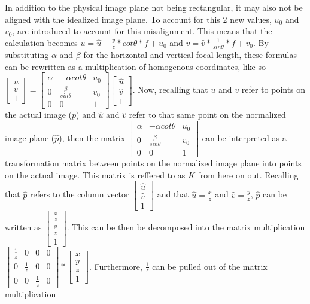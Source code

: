 In addition to the physical image plane not being rectangular, it may also not be aligned with the idealized image plane.  To
account for this 2 new values, $u_0$ and $v_0$, are introduced to account for this misalignment.  This means that the
calculation becomes $u=\hat{u}-\frac{y}{z} * cot \theta * f + u_0$ and $v=\hat{v} * \frac{1}{sin \theta} * f + 
v_0$. By substituting $\alpha$ and $\beta$ for the horizontal and vertical focal length, these formulas can be rewritten as a 
multiplication of homogenous coordinates, like so $\begin{bmatrix} u \\ v \\ 1 \end{bmatrix} = \begin{bmatrix} \alpha & -\alpha 
cot\theta & u_{0} \\ 0 & \frac{\beta}{sin\theta} & v_{0} \\ 0 & 0 & 1 \end{bmatrix} \begin{bmatrix}\hat{u} \\ \hat{v}\\ 
1\end{bmatrix}$.  
Now, recalling that $u$ and $v$ refer to points on the actual image ($p$) and $\hat{u}$ and $\hat{v}$ refer to that same point 
on the normalized image plane ($\hat{p}$), then the matrix $\begin{bmatrix} \alpha & -\alpha cot\theta & u_0 \\ 0 & \frac{\beta}
{sin\theta} & v_0 \\ 0 & 0 & 1 \end{bmatrix}$ can be interpreted as a transformation matrix between points on the normalized image 
plane into points on the actual image.  This matrix is reffered to as $K$ from here on out.  Recalling that $\hat{p}$ refers to 
the column vector $\begin{bmatrix} \hat{u} \\ \hat{v} \\ 1 \end{bmatrix}$ and that $\hat{u} = \frac{x}{z}$ and $\hat{v} = \frac{y}
{z}$, $\hat{p}$ can be written as $\begin{bmatrix} \frac{x}{z} \\ \frac{y}{z} \\ 1 \end{bmatrix}$.  This can be then be decomposed into the matrix multiplication $\begin{bmatrix} \frac{1}{z} & 0 & 0 & 0 \\ 0 & \frac{1}{z} & 0 & 0 \\ 0 & 0 & \frac{1}{z} & 0 
\end{bmatrix} * \begin{bmatrix} x \\ y \\ z \\ 1 \end{bmatrix}$.  Furthermore, $\frac{1}{z}$ can be pulled out of the matrix multiplication 
